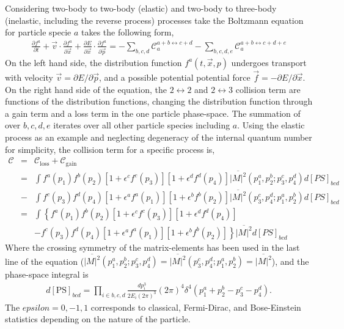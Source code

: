 Considering two-body to two-body (elastic) and two-body to three-body (inelastic, including the reverse process) processes take the Boltzmann equation for particle specie $a$ takes the following form,
\begin{eqnarray}
\frac{\partial f^a}{\partial t} + \vec{v}\cdot\frac{\partial f^a}{\partial \vec{x}} + \frac{\partial E}{\partial \vec{x}}\cdot\frac{\partial f^{a}}{\partial \vec{p}} = - \sum_{b,c,d}\mathcal{C}_a^{a+b\leftrightarrow c+d}- \sum_{b,c,d,e}\mathcal{C}_a^{a+b\leftrightarrow c+d+e}
\end{eqnarray}
On the left hand side, the distribution function $f^{a}(t, \vec{x}, p)$ undergoes transport with velocity $\vec{v} = \partial E/\partial \vec{p}$, and a possible potential potential force $\vec{f} = -\partial E/\partial \vec{x}$.
On the right hand side of the equation, the $2\leftrightarrow 2$ and $2\leftrightarrow 3$ collision term are functions of the distribution functions, changing the distribution function through a gain term and a loss term in the one particle phase-space.
The summation of over $b,c,d,e$ iterates over all other particle species including $a$.
Using the elastic process as an example and neglecting degeneracy of the internal quantum number for simplicity, the collision term for a specific process is,
\begin{eqnarray}
\mathcal{C} &=& \mathcal{C}_\textrm{loss} + \mathcal{C}_\textrm{gain}\\
&=& \int f^a(p_1)f^b(p_2)[1+\epsilon^c f^c(p_3)][1+\epsilon^d f^d(p_4)] \overline{|M|^2}(p_1^a, p_2^b; p_3^c, p_4^d) d[PS]_{bcd} \\\nonumber
&-& \int f^c(p_3)f^d(p_4)[1+\epsilon^a f^a(p_1)][1+\epsilon^b f^b(p_2)] \overline{|M|^2}(p_3^c, p_4^d; p_1^a, p_2^b) d[PS]_{bcd} \\
&=& \int \left\{
f^a(p_1)f^b(p_2)[1+\epsilon^c f^c(p_3)][1+\epsilon^d f^d(p_4)] \right. \label{eq:collision-term:symmetry} \\\nonumber
&& \left.- f^c(p_3)f^d(p_4)[1+\epsilon^a f^a(p_1)][1+\epsilon^b f^b(p_2)]\right\}
\overline{|M|^2} d[PS]_{bcd} 
\end{eqnarray}
Where the crossing symmetry of the matrix-elements has been used in the last line of the equation ($\overline{|M|^2}(p_1^a, p_2^b; p_3^c, p_4^d) = \overline{|M|^2}(p_3^c, p_4^d; p_1^a, p_2^b) = \overline{|M|^2}$), and the phase-space integral is 
\begin{eqnarray}
d[\textrm{PS}]_{bcd} = \prod_{i\in {b,c,d}}\frac{dp_i^3}{2E_i (2\pi)^3} (2\pi)^4 \delta^{4}(p^a_1+p^b_2 - p^c_3-p^d_4).
\end{eqnarray}
The $epsilon = 0, -1, 1$ corresponds to classical, Fermi-Dirac, and Bose-Einstein statistics depending on the nature of the particle.

